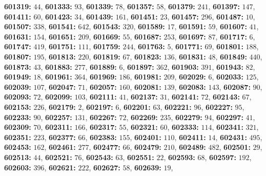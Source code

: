 \textsf{\bfseries 601319:} $44$, \textsf{\bfseries 601333:} $93$, \textsf{\bfseries 601339:} $78$, \textsf{\bfseries 601357:} $58$, \textsf{\bfseries 601379:} $241$, \textsf{\bfseries 601397:} $147$, \textsf{\bfseries 601411:} $60$, \textsf{\bfseries 601423:} $34$, \textsf{\bfseries 601439:} $161$, \textsf{\bfseries 601451:} $23$, \textsf{\bfseries 601457:} $296$, \textsf{\bfseries 601487:} $10$, \textsf{\bfseries 601507:} $338$, \textsf{\bfseries 601541:} $642$, \textsf{\bfseries 601543:} $320$, \textsf{\bfseries 601589:} $17$, \textsf{\bfseries 601591:} $59$, \textsf{\bfseries 601607:} $41$, \textsf{\bfseries 601631:} $154$, \textsf{\bfseries 601651:} $209$, \textsf{\bfseries 601669:} $55$, \textsf{\bfseries 601687:} $253$, \textsf{\bfseries 601697:} $87$, \textsf{\bfseries 601717:} $6$, \textsf{\bfseries 601747:} $419$, \textsf{\bfseries 601751:} $111$, \textsf{\bfseries 601759:} $244$, \textsf{\bfseries 601763:} $5$, \textsf{\bfseries 601771:} $69$, \textsf{\bfseries 601801:} $188$, \textsf{\bfseries 601807:} $195$, \textsf{\bfseries 601813:} $220$, \textsf{\bfseries 601819:} $67$, \textsf{\bfseries 601823:} $136$, \textsf{\bfseries 601831:} $48$, \textsf{\bfseries 601849:} $440$, \textsf{\bfseries 601873:} $43$, \textsf{\bfseries 601883:} $277$, \textsf{\bfseries 601889:} $6$, \textsf{\bfseries 601897:} $362$, \textsf{\bfseries 601903:} $391$, \textsf{\bfseries 601943:} $82$, \textsf{\bfseries 601949:} $18$, \textsf{\bfseries 601961:} $364$, \textsf{\bfseries 601969:} $186$, \textsf{\bfseries 601981:} $209$, \textsf{\bfseries 602029:} $6$, \textsf{\bfseries 602033:} $125$, \textsf{\bfseries 602039:} $107$, \textsf{\bfseries 602047:} $71$, \textsf{\bfseries 602057:} $160$, \textsf{\bfseries 602081:} $139$, \textsf{\bfseries 602083:} $143$, \textsf{\bfseries 602087:} $90$, \textsf{\bfseries 602093:} $72$, \textsf{\bfseries 602099:} $103$, \textsf{\bfseries 602111:} $41$, \textsf{\bfseries 602137:} $31$, \textsf{\bfseries 602141:} $72$, \textsf{\bfseries 602143:} $67$, \textsf{\bfseries 602153:} $226$, \textsf{\bfseries 602179:} $2$, \textsf{\bfseries 602197:} $6$, \textsf{\bfseries 602201:} $63$, \textsf{\bfseries 602221:} $96$, \textsf{\bfseries 602227:} $95$, \textsf{\bfseries 602233:} $90$, \textsf{\bfseries 602257:} $131$, \textsf{\bfseries 602267:} $72$, \textsf{\bfseries 602269:} $235$, \textsf{\bfseries 602279:} $94$, \textsf{\bfseries 602297:} $41$, \textsf{\bfseries 602309:} $70$, \textsf{\bfseries 602311:} $166$, \textsf{\bfseries 602317:} $55$, \textsf{\bfseries 602321:} $60$, \textsf{\bfseries 602333:} $114$, \textsf{\bfseries 602341:} $321$, \textsf{\bfseries 602351:} $223$, \textsf{\bfseries 602377:} $66$, \textsf{\bfseries 602383:} $155$, \textsf{\bfseries 602401:} $110$, \textsf{\bfseries 602411:} $14$, \textsf{\bfseries 602431:} $495$, \textsf{\bfseries 602453:} $162$, \textsf{\bfseries 602461:} $277$, \textsf{\bfseries 602477:} $66$, \textsf{\bfseries 602479:} $210$, \textsf{\bfseries 602489:} $482$, \textsf{\bfseries 602501:} $29$, \textsf{\bfseries 602513:} $44$, \textsf{\bfseries 602521:} $76$, \textsf{\bfseries 602543:} $63$, \textsf{\bfseries 602551:} $22$, \textsf{\bfseries 602593:} $68$, \textsf{\bfseries 602597:} $192$, \textsf{\bfseries 602603:} $396$, \textsf{\bfseries 602621:} $222$, \textsf{\bfseries 602627:} $58$, \textsf{\bfseries 602639:} $19$, 
